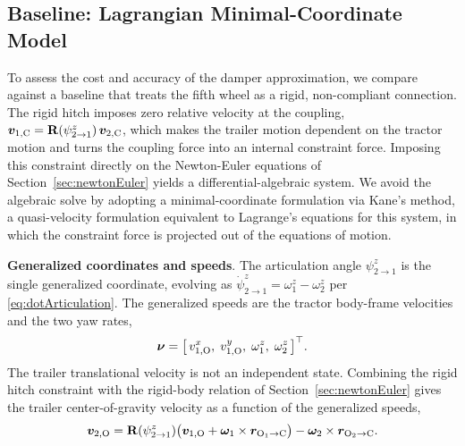 \documentclass[conference]{IEEEtran}
\begin{document}
\subsection{Baseline: Lagrangian Minimal-Coordinate Model}
\label{sec:baseline_model}
To assess the cost and accuracy of the damper approximation, we compare against a baseline that treats the fifth wheel as a rigid, non-compliant connection. The rigid hitch imposes zero relative velocity at the coupling, $\bm v_{1,\text{C}} = \mathbf R(\psi^z_{2\to1})\,\bm v_{2,\text{C}}$, which makes the trailer motion dependent on the tractor motion and turns the coupling force into an internal constraint force. Imposing this constraint directly on the Newton-Euler equations of Section~\ref{sec:newtonEuler} yields a differential-algebraic system. We avoid the algebraic solve by adopting a minimal-coordinate formulation via Kane's method, a quasi-velocity formulation equivalent to Lagrange's equations for this system, in which the constraint force is projected out of the equations of motion.

\textbf{Generalized coordinates and speeds}. The articulation angle $\psi^z_{2\to1}$ is the single generalized coordinate, evolving as $\dot\psi^z_{2\to1} = \omega^z_1 - \omega^z_2$ per \eqref{eq:dotArticulation}. The generalized speeds are the tractor body-frame velocities and the two yaw rates,
\begin{equation}
\bm\nu = \big[\,v^x_{1,\text{O}},\; v^y_{1,\text{O}},\; \omega^z_1,\; \omega^z_2\,\big]^\top .
\end{equation}
The trailer translational velocity is not an independent state. Combining the rigid hitch constraint with the rigid-body relation of Section~\ref{sec:newtonEuler} gives the trailer center-of-gravity velocity as a function of the generalized speeds,
\begin{equation}
\bm v_{2,\text{O}} = \mathbf R(\psi^z_{2\to1})\big(\bm v_{1,\text{O}} + \bm\omega_1\times\bm r_{\text{O}_1\to\text{C}}\big) - \bm\omega_2\times\bm r_{\text{O}_2\to\text{C}}. \label{eq:trailerConstraint}
\end{equation}
\end{document}
